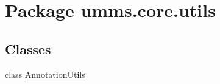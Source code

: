 \hypertarget{namespaceumms_1_1core_1_1utils}{\section{Package umms.\+core.\+utils}
\label{namespaceumms_1_1core_1_1utils}
}
\subsection*{Classes}
\begin{DoxyCompactItemize}
\item 
class \hyperlink{classumms_1_1core_1_1utils_1_1_annotation_utils}{Annotation\+Utils}
\end{DoxyCompactItemize}
